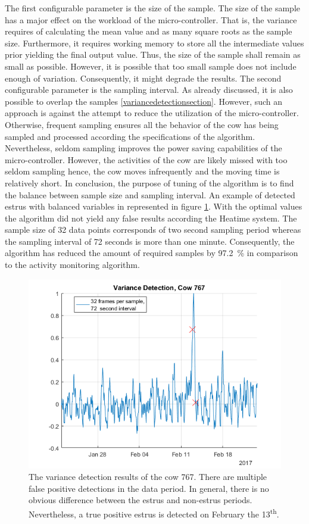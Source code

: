 \documentclass[english,12pt,a4paper,pdftex,elec,utf8]{aaltothesis}
\begin{document}
The first configurable parameter is the size of the sample. The size of the sample has a major effect on the workload of the micro-controller. That is, the variance requires of calculating the mean value and as many square roots as the sample size. Furthermore, it requires working memory to store all the intermediate values prior yielding the final output value. Thus, the size of the sample shall remain as small as possible. However, it is possible that too small sample does not include enough of variation. Consequently, it might degrade the results. The second configurable parameter is the sampling interval. As already discussed, it is also possible to overlap the samples \ref{variancedetectionsection}. However, such an approach is against the attempt to reduce the utilization of the micro-controller. Otherwise, frequent sampling ensures all the behavior of the cow has being sampled and processed according the specifications of the algorithm. Nevertheless, seldom sampling improves the power saving capabilities of the micro-controller. However, the activities of the cow are likely missed with too seldom sampling hence, the cow moves infrequently and the moving time is relatively short. In conclusion, the purpose of tuning of the algorithm is to find the balance between sample size and sampling interval. An example of detected estrus with balanced variables in represented in figure \ref{VarianceDetectionCow767}. With the optimal values the algorithm did not yield any false results according the Heatime system. The sample size of 32 data points corresponds of two second sampling period whereas the sampling interval of 72 seconds is more than one minute. Consequently, the algorithm has reduced the amount of required samples by \SI{97.2}{\percent} in comparison to the activity monitoring algorithm.


\begin{figure}[htb]
\centering
\includegraphics[width = 0.75 \textwidth]{figures/VarianceDetectionCow767.png}
\caption{The variance detection results of the cow 767. There are multiple false positive detections in the data period. In general, there is no obvious difference between the estrus and non-estrus periods. Nevertheless, a true positive estrus is detected on February the 13\textsuperscript{th}.}
\label{VarianceDetectionCow767}
\end{figure}
\end{document}
